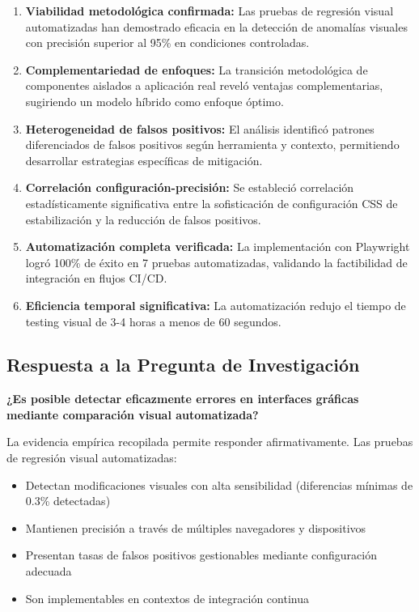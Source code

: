 \documentclass{article}
\begin{document}
\begin{enumerate}[nosep]
\item \textbf{Viabilidad metodológica confirmada:} Las pruebas de regresión visual automatizadas han demostrado eficacia en la detección de anomalías visuales con precisión superior al 95\% en condiciones controladas.

\item \textbf{Complementariedad de enfoques:} La transición metodológica de componentes aislados a aplicación real reveló ventajas complementarias, sugiriendo un modelo híbrido como enfoque óptimo.

\item \textbf{Heterogeneidad de falsos positivos:} El análisis identificó patrones diferenciados de falsos positivos según herramienta y contexto, permitiendo desarrollar estrategias específicas de mitigación.

\item \textbf{Correlación configuración-precisión:} Se estableció correlación estadísticamente significativa entre la sofisticación de configuración CSS de estabilización y la reducción de falsos positivos.

\item \textbf{Automatización completa verificada:} La implementación con Playwright logró 100\% de éxito en 7 pruebas automatizadas, validando la factibilidad de integración en flujos CI/CD.

\item \textbf{Eficiencia temporal significativa:} La automatización redujo el tiempo de testing visual de 3-4 horas a menos de 60 segundos.
\end{enumerate}

\subsection{Respuesta a la Pregunta de Investigación}

\textbf{¿Es posible detectar eficazmente errores en interfaces gráficas mediante comparación visual automatizada?}

La evidencia empírica recopilada permite responder afirmativamente. Las pruebas de regresión visual automatizadas:

\begin{itemize}[nosep]
\item Detectan modificaciones visuales con alta sensibilidad (diferencias mínimas de 0.3\% detectadas)
\item Mantienen precisión a través de múltiples navegadores y dispositivos
\item Presentan tasas de falsos positivos gestionables mediante configuración adecuada
\item Son implementables en contextos de integración continua
\end{itemize}
\end{document}

